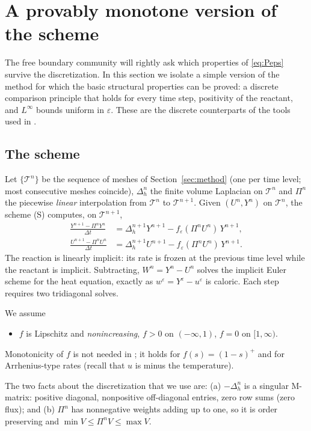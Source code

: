 \documentclass[11pt]{amsart}
\theoremstyle{remark}
\newcommand{\ve}{\varepsilon}
\begin{document}
\section{A provably monotone version of the scheme}\label{sec:theory}

The free boundary community will rightly ask which properties of
\eqref{eq:Peps} survive the discretization. In this section we isolate a
simple version of the method for which the basic structural properties can
be proved: a discrete comparison principle that holds for every time step,
positivity of the reactant, and $L^\infty$ bounds uniform in $\ve$. These are
the discrete counterparts of the tools used in
\cite{CaffarelliVazquez1995,FernandezBonderWolanski2000,FernandezBonderWolanski2004}.

\subsection{The scheme}
Let $\{\mathcal T^n\}$ be the sequence of meshes of Section~\ref{sec:method}
(one per time level; most consecutive meshes coincide), $\Delta_h^n$ the
finite volume Laplacian on $\mathcal T^n$ and $\Pi^n$ the piecewise
\emph{linear} interpolation from $\mathcal T^n$ to $\mathcal T^{n+1}$. Given
$(U^n,Y^n)$ on $\mathcal T^n$, the scheme (S) computes, on $\mathcal T^{n+1}$,
\begin{align}
\frac{Y^{n+1}-\Pi^nY^n}{\Delta t}&=\Delta_h^{n+1}Y^{n+1}-f_\ve(\Pi^nU^n)\,Y^{n+1},\label{eq:SY}\\
\frac{U^{n+1}-\Pi^nU^n}{\Delta t}&=\Delta_h^{n+1}U^{n+1}-f_\ve(\Pi^nU^n)\,Y^{n+1}.\label{eq:SU}
\end{align}
The reaction is linearly implicit: its rate is frozen at the previous time
level while the reactant is implicit. Subtracting, $W^n=Y^n-U^n$ solves the
implicit Euler scheme for the heat equation, exactly as $w^\ve=Y^\ve-u^\ve$
is caloric. Each step requires two tridiagonal solves.

We assume
\begin{itemize}
\item[(F)] $f$ is Lipschitz and \emph{nonincreasing}, $f>0$ on $(-\infty,1)$,
$f=0$ on $[1,\infty)$.
\end{itemize}
Monotonicity of $f$ is not needed in \cite{FernandezBonderWolanski2000}; it
holds for $f(s)=(1-s)^+$ and for Arrhenius-type rates (recall that $u$ is
minus the temperature).

The two facts about the discretization that we use are:
(a) $-\Delta_h^n$ is a singular M-matrix: positive diagonal, nonpositive
off-diagonal entries, zero row sums (zero flux); and
(b) $\Pi^n$ has nonnegative weights adding up to one, so it is order
preserving and $\min V\le\Pi^nV\le\max V$.
\end{document}
